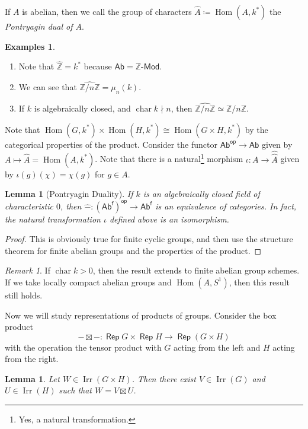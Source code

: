 \documentclass[leqno, openany]{memoir}
\newtheorem{lem}[thm]{Lemma}
\theoremstyle{definition}
\newtheorem{exms}[thm]{Examples}
\theoremstyle{remark}
\newtheorem{rmk}[thm]{Remark}
\theoremstyle{plain}
\theoremstyle{definition}
\theoremstyle{remark}
\newcommand{\Z}{\mathbb{Z}}
\newcommand{\wh}[1]{\widehat{#1}}
\DeclareMathOperator{\Irr}{\mathrm{Irr}}
\DeclareMathOperator{\Rep}{\mathsf{Rep}}
\DeclareMathOperator{\Hom}{Hom}
\DeclareMathOperator{\Char}{char}
\begin{document}
If $A$ is abelian, then we call the group of characters $\wh{A} \coloneqq
\Hom(A, k^*)$ the \textit{Pontryagin dual of $A$}.

\begin{exms} \hfill \begin{enumerate} \item Note that $\wh{\Z} = k^*$ because
    $\mathsf{Ab} = \Z\text{-}\mathsf{Mod}$.  \item We can see that $\wh{\Z/n\Z}
    = \mu_n(k)$.  \item If $k$ is algebraically closed, and $\Char k \nmid n$,
    then $\wh{\Z/n\Z} \simeq \Z/n\Z$.  \end{enumerate} \end{exms}

Note that $\Hom(G, k^*) \times \Hom(H, k^*) \cong \Hom(G \times H, k^*)$ by the
categorical properties of the product. Consider the functor $\mathsf{Ab^{op}}
\to \mathsf{Ab}$ given by $A \mapsto \wh{A} = \Hom(A, k^*)$. Note that there is
a natural\footnote{Yes, a natural transformation.} morphism $\iota: A \to
\wh{\wh{A}}$ given by $\iota(g)(\chi) = \chi(g)$ for $g \in A$.

\begin{lem}[Pontryagin Duality] If $k$ is an algebraically closed field of
    characteristic $0$, then $\wh{-}: \mathsf{(Ab^f)^{op}} \to \mathsf{Ab^f}$
    is an equivalence of categories. In fact, the natural transformation
    $\iota$ defined above is an isomorphism.  \end{lem}

\begin{proof} This is obviously true for finite cyclic groups, and then use the
structure theorem for finite abelian groups and the properties of the product.
\end{proof}

\begin{rmk} If $\Char k > 0$, then the result extends to finite abelian group
schemes. If we take locally compact abelian groups and $\Hom(A, S^1)$, then
this result still holds.  \end{rmk}

Now we will study representations of products of groups. Consider the box
product \[ -\boxtimes-: \Rep G \times \Rep H \to \Rep(G \times H) \] with the
operation the tensor product with $G$ acting from the left and $H$ acting from
the right.

\begin{lem} Let $W \in \Irr(G \times H)$. Then there exist $V \in \Irr(G)$ and
$U \in \Irr(H)$ such that $W = V \boxtimes U$.  \end{lem}
\end{document}
